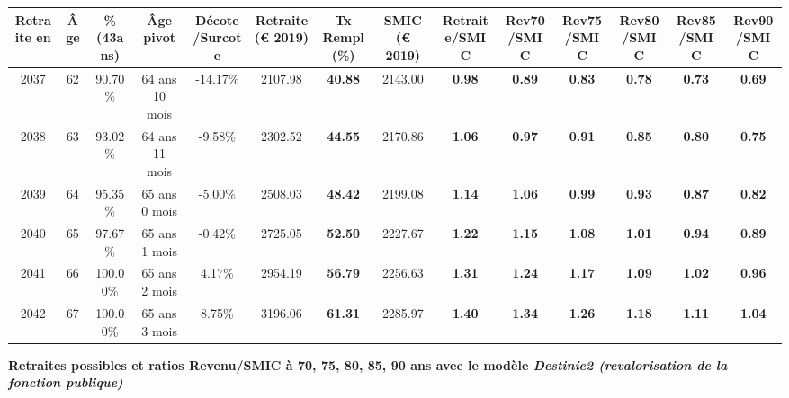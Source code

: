 \begin{adjustbox}{max width=\textwidth} 
\begin{tabular}[htb]{|c|c||c|c|c||c|c||c||c|c|c|c|c|c|} 
\hline 
 Retraite en &  Âge &  \%(43ans) &  Âge pivot &  Décote/Surcote &  Retraite (\euro{} 2019) &  Tx Rempl(\%) &  SMIC (\euro{} 2019) &  Retraite/SMIC &  Rev70/SMIC &  Rev75/SMIC &  Rev80/SMIC &  Rev85/SMIC &  Rev90/SMIC \\ 
\hline \hline 
 2037 &  62 &  90.70\% &  64 ans 10 mois &  -14.17\% &  2107.98 &  {\bf 40.88} &  2143.00 &  {\bf {\color{red} 0.98}} &  {\bf {\color{red} 0.89}} &  {\bf {\color{red} 0.83}} &  {\bf {\color{red} 0.78}} &  {\bf {\color{red} 0.73}} &  {\bf {\color{red} 0.69}} \\ 
\hline 
 2038 &  63 &  93.02\% &  64 ans 11 mois &  -9.58\% &  2302.52 &  {\bf 44.55} &  2170.86 &  {\bf 1.06} &  {\bf {\color{red} 0.97}} &  {\bf {\color{red} 0.91}} &  {\bf {\color{red} 0.85}} &  {\bf {\color{red} 0.80}} &  {\bf {\color{red} 0.75}} \\ 
\hline 
 2039 &  64 &  95.35\% &  65 ans 0 mois &  -5.00\% &  2508.03 &  {\bf 48.42} &  2199.08 &  {\bf 1.14} &  {\bf 1.06} &  {\bf {\color{red} 0.99}} &  {\bf {\color{red} 0.93}} &  {\bf {\color{red} 0.87}} &  {\bf {\color{red} 0.82}} \\ 
\hline 
 2040 &  65 &  97.67\% &  65 ans 1 mois &  -0.42\% &  2725.05 &  {\bf 52.50} &  2227.67 &  {\bf 1.22} &  {\bf 1.15} &  {\bf 1.08} &  {\bf 1.01} &  {\bf {\color{red} 0.94}} &  {\bf {\color{red} 0.89}} \\ 
\hline 
 2041 &  66 &  100.00\% &  65 ans 2 mois &  4.17\% &  2954.19 &  {\bf 56.79} &  2256.63 &  {\bf 1.31} &  {\bf 1.24} &  {\bf 1.17} &  {\bf 1.09} &  {\bf 1.02} &  {\bf {\color{red} 0.96}} \\ 
\hline 
 2042 &  67 &  100.00\% &  65 ans 3 mois &  8.75\% &  3196.06 &  {\bf 61.31} &  2285.97 &  {\bf 1.40} &  {\bf 1.34} &  {\bf 1.26} &  {\bf 1.18} &  {\bf 1.11} &  {\bf 1.04} \\ 
\hline 
\hline 
\end{tabular} 
\end{adjustbox} 
 
 \vspace{0.1cm} 
{\bf \noindent Retraites possibles et ratios Revenu/SMIC à 70, 75, 80, 85, 90 ans avec le modèle \emph{Destinie2 (revalorisation de la fonction publique)}}  
 
